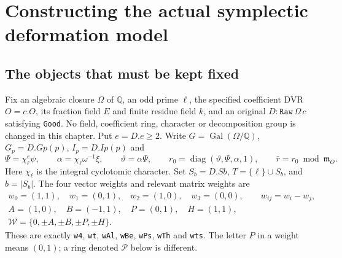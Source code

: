 \section{Constructing the actual symplectic deformation model}
\label{sec:symplectic-model-construction}


\subsection{The objects that must be kept fixed}

Fix an algebraic closure $\Omega$ of $\mathbb Q$, an odd prime
$\ell$, the specified coefficient DVR $O=c.O$, its fraction field
$E$ and finite residue field $k$, and an original
$D:\texttt{Raw}\,\Omega\,c$ satisfying \texttt{Good}.
No field, coefficient ring, character or decomposition group is
changed in this chapter.  Put $e=D.e\ge2$.
Write $G=\operatorname{Gal}(\Omega/\mathbb Q)$,
$G_p=D.Gp(p)$, $I_p=D.Ip(p)$ and
\[
 \Psi=\chi_\ell^{e}\psi,\qquad
 \alpha=\chi_\ell\omega^{-1}\xi,\qquad
 \vartheta=\alpha\Psi,\qquad
 r_0=\operatorname{diag}(\vartheta,\Psi,\alpha,1),
 \qquad \bar r=r_0\bmod\mathfrak m_O.
 \tag{MX.1}
\]
Here $\chi_\ell$ is the integral cyclotomic character.  Set
$S_b=D.Sb$, $T=\{\ell\}\cup S_b$, and $b=|S_b|$.
The four vector weights and relevant matrix weights are
\[
 \begin{gathered}
 w_0=(1,1),\quad w_1=(0,1),\quad
 w_2=(1,0),\quad w_3=(0,0),\qquad w_{ij}=w_i-w_j,\\
 A=(1,0),\quad B=(-1,1),\quad P=(0,1),\quad H=(1,1),\\
 \mathcal W=\{0,\pm A,\pm B,\pm P,\pm H\}.
 \end{gathered}
 \tag{MX.2}
\]
These are exactly \texttt{w4}, \texttt{wt}, \texttt{wAl},
\texttt{wBe}, \texttt{wPs}, \texttt{wTh} and \texttt{wts}.
The letter $P$ in a weight means $(0,1)$; a ring denoted
$\mathcal P$ below is different.

